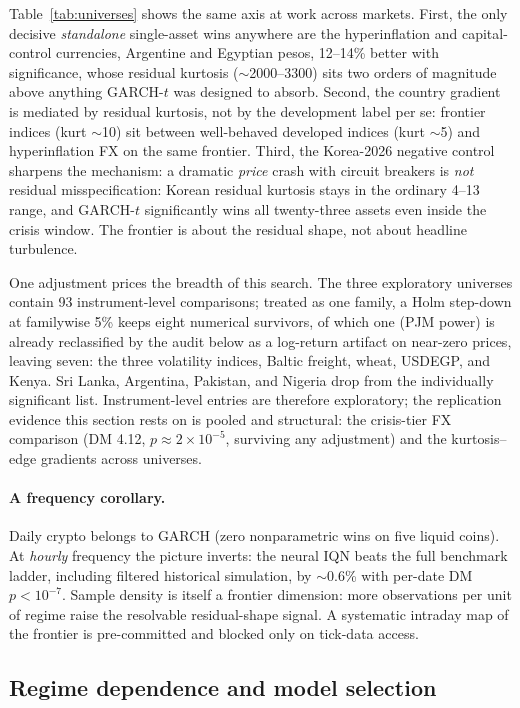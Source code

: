 \documentclass[11pt]{article}
\theoremstyle{remark}
\begin{document}
Table~\ref{tab:universes} shows the same axis at work across markets.
First, the only decisive
\emph{standalone} single-asset wins anywhere are the hyperinflation and capital-control currencies, Argentine and Egyptian pesos, 12--14\%
better with significance, whose residual kurtosis ($\sim$2000--3300)
sits two orders of magnitude above anything GARCH-$t$ was designed to
absorb. Second, the country gradient is mediated by residual kurtosis,
not by the development label per se: frontier indices (kurt $\sim$10)
sit between well-behaved developed indices (kurt $\sim$5) and
hyperinflation FX on the same frontier. Third, the Korea-2026 negative
control sharpens the mechanism: a dramatic \emph{price} crash with
circuit breakers is \emph{not} residual misspecification: Korean residual kurtosis stays in the ordinary 4--13 range, and GARCH-$t$
significantly wins all twenty-three assets even inside the crisis
window. The frontier is about the residual shape, not about headline
turbulence.

One adjustment prices the breadth of this search. The three
exploratory universes contain 93 instrument-level comparisons; treated
as one family, a Holm step-down at familywise 5\% keeps eight numerical survivors, of which one (PJM power)
is already reclassified by the audit below as a log-return artifact on
near-zero prices, leaving seven: the three volatility indices, Baltic
freight, wheat, USDEGP, and Kenya. Sri Lanka, Argentina, Pakistan, and
Nigeria drop from the individually significant list. Instrument-level
entries are therefore exploratory; the replication evidence this
section rests on is pooled and structural: the crisis-tier FX
comparison (DM 4.12, $p\approx2\times10^{-5}$, surviving any
adjustment) and the kurtosis--edge gradients across universes.

\paragraph{A frequency corollary.} Daily crypto belongs to GARCH (zero
nonparametric wins on five liquid coins). At \emph{hourly} frequency the
picture inverts: the neural IQN beats the full benchmark ladder,
including filtered historical simulation, by $\sim$0.6\% with per-date
DM $p < 10^{-7}$. Sample density is itself a frontier dimension: more
observations per unit of regime raise the resolvable residual-shape
signal. A systematic intraday map of the frontier is pre-committed and
blocked only on tick-data access.

\subsection{Regime dependence and model selection}
\label{sec:gate}
\end{document}
